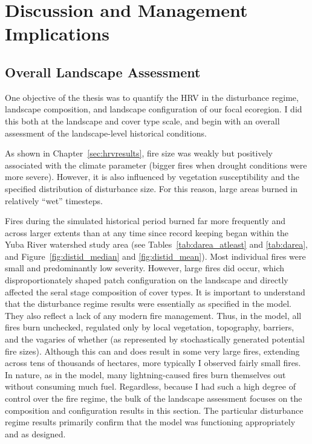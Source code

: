 
\section{Discussion and Management Implications}
\label{sec:hrvdiscussion}






\subsection{Overall Landscape Assessment}

One objective of the thesis was to quantify the HRV in the disturbance regime, landscape composition, and landscape configuration of our focal ecoregion. I did this both at the landscape and cover type scale, and begin with an overall assessment of the landscape-level historical conditions.

As shown in Chapter~\ref{sec:hrvresults}, fire size was weakly but positively associated with the climate parameter (bigger fires when drought conditions were more severe). However, it is also influenced by vegetation susceptibility and the specified distribution of disturbance size. For this reason, large areas burned in relatively ``wet'' timesteps. 

Fires during the simulated historical period burned far more frequently and across larger extents than at any time since record keeping began within the Yuba River watershed study area (see Tables~\ref{tab:darea_atleast} and \ref{tab:darea}, and Figure~\ref{fig:distid_median} and \ref{fig:distid_mean}). Most individual fires were small and predominantly low severity. However, large fires did occur, which disproportionately shaped patch configuration on the landscape and directly affected the seral stage composition of cover types. It is important to understand that the disturbance regime results were essentially as specified in the model. They also reflect a lack of any modern fire management. Thus, in the model, all fires burn unchecked, regulated only by local vegetation, topography, barriers, and the vagaries of whether (as represented by stochastically generated potential fire sizes). Although this can and does result in some very large fires, extending across tens of thousands of hectares, more typically I observed fairly small fires. In nature, as in the model, many lightning-caused fires burn themselves out without consuming much fuel. Regardless, because I had such a high degree of control over the fire regime, the bulk of the landscape assessment focuses on the composition and configuration results in this section. The particular disturbance regime results primarily confirm that the model was functioning appropriately and as designed.

